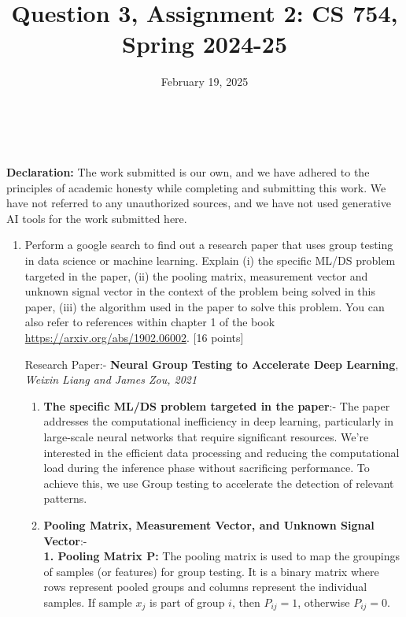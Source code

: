 \documentclass{article}
\title{Question 3, Assignment 2: CS 754, Spring 2024-25}
\author{
\IEEEauthorblockN{
    \begin{tabular}{cccc}
        \begin{minipage}[t]{0.23\textwidth}
            \centering
            Amitesh Shekhar\\
            IIT Bombay\\
            22b0014@iitb.ac.in
        \end{minipage} & 
        \begin{minipage}[t]{0.23\textwidth}
            \centering
            Anupam Rawat\\
            IIT Bombay\\
            22b3982@iitb.ac.in
        \end{minipage} & 
        \begin{minipage}[t]{0.23\textwidth}
            \centering
            Toshan Achintya Golla\\
            IIT Bombay\\
            22b2234@iitb.ac.in
        \end{minipage} \\
        \\ 
    \end{tabular}
}
}
\date{February 19, 2025}
\begin{document}
\maketitle

\\
\\

\textbf{Declaration:} The work submitted is our own, and
we have adhered to the principles of academic honesty while completing and submitting this work. We have not
referred to any unauthorized sources, and we have not used generative AI tools for the work submitted here.

\begin{enumerate}
    \item Perform a google search to find out a research paper that uses group testing in data science or machine learning. Explain (i) the specific ML/DS problem targeted in the paper, (ii) the pooling matrix, measurement vector and unknown signal vector in the context of the problem being solved in this paper, (iii) the algorithm used in the paper to solve this problem. You can also refer to references within chapter 1 of the book \url{https://arxiv.org/abs/1902.06002}. \textsf{[16 points]} \\

    Research Paper:- \textbf{Neural Group Testing to Accelerate Deep Learning}, \textit{Weixin Liang and James Zou, 2021}
    \begin{enumerate}
        \item \textbf{The specific ML/DS problem targeted in the paper}:- The paper addresses the computational inefficiency in deep learning, particularly in large-scale neural networks that require significant resources. We're interested in the efficient data processing and reducing the computational load during the inference phase without sacrificing performance. To achieve this, we use Group testing to accelerate the detection of relevant patterns.
        \item \textbf{Pooling Matrix, Measurement Vector, and Unknown Signal Vector}:- \\
        \textbf{1. Pooling Matrix \( \mathbf{P} \):}
        The pooling matrix is used to map the groupings of samples (or features) for group testing. It is a binary matrix where rows represent pooled groups and columns represent the individual samples. If sample \( x_j \) is part of group \( i \), then \( P_{ij} = 1 \), otherwise \( P_{ij} = 0 \).
        

\end{enumerate}
\end{enumerate}
\end{document}
